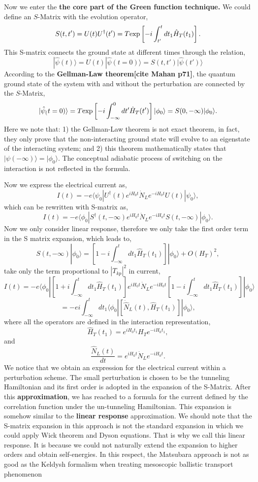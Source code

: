 \documentclass[11pt]{article}
\begin{document}
    Now we enter the \textbf{the core part of the Green function technique.}
We could define an \(S\)-Matrix with the evolution operator, \[
S(t,t') = U(t) U^\dagger(t')= T {\rm exp}\left[-i\int_{t'}^t dt_1 {\hat H}_T(t_1)\right].
\] This S-matrix connects the ground state at different times through
the relation, \[
|\hat \psi(t)\rangle=U(t) | \hat \psi(t=0)\rangle=S(t,t')|\hat \psi(t')\rangle
\] According to the \textbf{Gellman-Law theorem{[}cite Mahan p71{]}},
the quantum ground state of the system with and without the perturbation
are connected by the \(S\)-Matrix, \[
|\hat \psi_(t=0) \rangle =T {\rm exp}\left[-i\int_{-\infty}^0 dt' \hat H_T(t')\right] |\phi_0 \rangle = S(0,-\infty) |\phi _0 \rangle.
\] Here we note that: 1) the Gellman-Law theorem is not exact theorem,
in fact, they only prove that the non-interacting ground state will
evolve to an eigenstate of the interacting system; and 2) this theorem
mathematically states that \(|\psi(-\infty) \rangle = |\phi_0 \rangle\).
The conceptual adiabatic process of switching on the interaction is not
reflected in the formula.

    Now we express the electrical current as, \[
I(t) =-e \langle  \psi_0|U^{\dagger}(t)e^{iH_0t}\dot
N_Le^{-iH_0t}U(t)|\psi_0 \rangle,
\] which can be rewritten with S-matrix as, \[
I(t) =-e \langle  \phi_0|S^{\dagger}(t,-\infty)e^{iH_0t}\dot
N_Le^{-iH_0t}S(t,-\infty)|\phi_0 \rangle.
\] Now we only consider linear response, therefore we only take the
first order term in the S matrix expansion, which leads to, \[
S(t,-\infty)|\phi_0 \rangle =\left[1-i\int_{-\infty}^t dt_1 \hat H_T(t_1)\right]|\phi_0 \rangle + O(H_T)^2,
\] take only the term proportional to \(|T_{kp}|^2\) in current, \[
I(t)=  -e \langle  \phi_0|\left[1+ i\int_{-\infty}^t dt_1 \hat H_T(t_1)\right]e^{iH_0t}\dot
N_Le^{-iH_0t}\left[1-i\int_{-\infty}^t dt_1 \hat H_T(t_1)\right]|\phi_0 \rangle
\] \[
=-ei\int_{-\infty}^t dt_1 \langle  \phi_0|\left[\dot {\hat N}_L(t),\hat H_T(t_1)\right]|\phi_0 \rangle,
\] where all the operators are defined in the interaction
representation, \[
\hat H_T(t_1)=e^{iH_0t_1}H_Te^{-iH_0t_1},
\] and \[
\frac{\hat{N}_L(t)}{dt}=e^{iH_0t}{\dot N}_Le^{-iH_0t}.
\] We notice that we obtain an expression for the electrical current
within a perturbation scheme. The small perturbation is chosen to be the
tunneling Hamiltonian and its first order is adopted in the expansion of
the S-Matrix. After this \textbf{approximation}, we has reached to a
formula for the current defined by the correlation function under the
un-tunneling Hamiltonian. This expansion is somehow similar to the
\textbf{linear response} approximation. We should note that the S-matrix
expansion in this approach is not the standard expansion in which we
could apply Wick theorem and Dyson equations. That is why we call this
linear response. It is because we could not naturally extend the
expansion to higher orders and obtain self-energies. In this respect,
the Matsubara approach is not as good as the Keldysh formalism when
treating mesoscopic ballistic transport phenomenon
\end{document}
